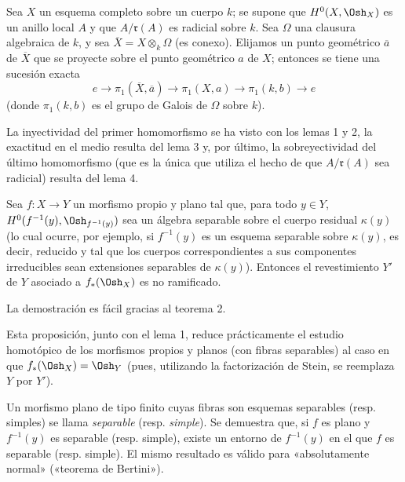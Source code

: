  Sea $X$ un esquema completo sobre un cuerpo $k$; se supone que
$H^0(X,\Osh_X)$ es un anillo local $A$ y que $A/\mathfrak r(A)$ es radicial
sobre $k$. Sea $\Omega$ una clausura algebraica de $k$, y sea
$\overline X=X\otimes_k\Omega$ (es conexo). Elijamos un punto geométrico
$\overline a$ de $\overline X$ que se proyecte sobre el punto geométrico $a$ de
$X$; entonces se tiene una sucesión exacta
\[
  e\longrightarrow\pi_1(\overline X,\overline a)
  \longrightarrow\pi_1(X,a)
  \longrightarrow\pi_1(k,b)\longrightarrow e
\]
(donde $\pi_1(k,b)$ es el grupo de Galois de $\Omega$ sobre $k$).

La inyectividad del primer homomorfismo se ha visto con los lemas 1 y 2, la
exactitud en el medio resulta del lema 3 y, por último, la sobreyectividad del
último homomorfismo (que es la única que utiliza el hecho de que
$A/\mathfrak r(A)$ sea radicial) resulta del lema 4.

 Sea $f:X\longrightarrow Y$ un morfismo propio y plano
tal que, para todo $y\in Y$, $H^0(f^{-1}(y),\Osh_{f^{-1}(y)})$ sea un álgebra
separable sobre el cuerpo residual $\kappa(y)$ (lo cual ocurre, por ejemplo, si
$f^{-1}(y)$ es un esquema separable sobre $\kappa(y)$, es decir, reducido y tal
que los cuerpos correspondientes a sus componentes irreducibles sean
extensiones separables de $\kappa(y)$). Entonces el revestimiento $Y'$ de $Y$
asociado a $f_*(\Osh_X)$ es no ramificado.

La demostración es fácil gracias al teorema 2.

Esta proposición, junto con el lema 1, reduce prácticamente el estudio
homotópico de los morfismos propios y planos (con fibras separables) al caso en
que $f_*(\Osh_X)=\Osh_Y$ (pues, utilizando la factorización de Stein, se
reemplaza $Y$ por $Y'$).

 Un morfismo plano de tipo finito cuyas fibras son
esquemas separables (resp. simples) se llama \emph{separable} (resp.
\emph{simple}). Se demuestra que, si $f$ es plano y $f^{-1}(y)$ es separable
(resp. simple), existe un entorno de $f^{-1}(y)$ en el que $f$ es separable
(resp. simple). El mismo resultado es válido para «absolutamente normal»
(«teorema de Bertini»).


